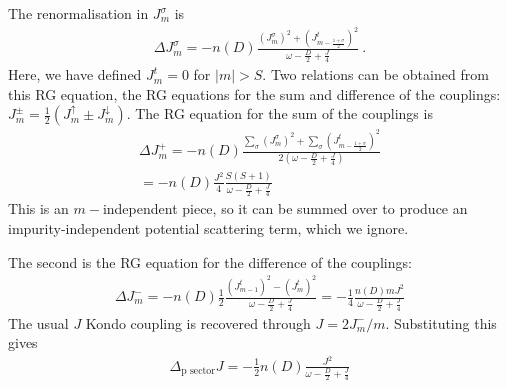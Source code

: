 \documentclass[reprint,prb,superscriptaddress]{revtex4-2}
\begin{document}
The renormalisation in \(J^\sigma_m\) is
\begin{equation}\begin{aligned}
	\Delta J^\sigma_{m} = - n(D) \frac{\left( J^\sigma_m \right) ^2 + \left( J^t_{m-\frac{1+\sigma}{2}} \right) ^2}{\omega - \frac{D}{2} + \frac{J}{4}}~.
\end{aligned}\end{equation}
Here, we have defined \(J^t_m = 0\) for \( |m| > S\). Two relations can be obtained from this RG equation, the RG equations for the sum and difference of the couplings: \(J^\pm_m = \frac{1}{2}\left(J^\uparrow_m \pm J^\downarrow_m\right) \). The RG equation for the sum of the couplings is
\begin{equation}\begin{aligned}
	\Delta J^+_m = -n(D)\frac{\sum_\sigma \left( J^\sigma_m \right) ^2 + \sum_\sigma \left( J^t_{m-\frac{1+\sigma}{2}} \right) ^2}{2\left(\omega - \frac{D}{2} + \frac{J}{4}\right)}\\
	= -n(D)\frac{J^2}{4}\frac{S(S+1)}{\omega - \frac{D}{2} + \frac{J}{4}}
\end{aligned}\end{equation}
This is an \(m-\)independent piece, so it can be summed over to produce an impurity-independent potential scattering term, which we ignore. 

The second is the RG equation for the difference of the couplings:
\begin{equation}\begin{aligned}
	\Delta J^-_m = -n(D)\frac{1}{2}\frac{\left( J^t_{m-1} \right) ^2 - \left(J^t_{m}\right) ^2}{\omega - \frac{D}{2} + \frac{J}{4}} = -\frac{1}{4}\frac{n(D) m J^2}{\omega - \frac{D}{2} + \frac{J}{4}}
\end{aligned}\end{equation}
The usual \(J\) Kondo coupling is recovered through \(J = 2J^-_m/m\). Substituting this gives 
\begin{equation}\begin{aligned}
	\Delta_\text{p sector} J = -\frac{1}{2}n(D)\frac{J^2}{\omega - \frac{D}{2} + \frac{J}{4}}
\end{aligned}\end{equation}
\end{document}

